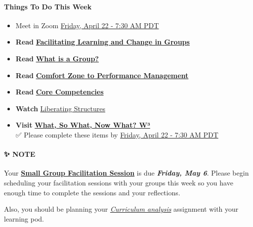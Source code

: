 \documentclass[
]{book}
\providecommand{\tightlist}{%
  \setlength{\itemsep}{0pt}\setlength{\parskip}{0pt}}
\begin{document}
\begin{todo}
\hypertarget{things-to-do-this-week}{%
\paragraph{Things To Do This Week}\label{things-to-do-this-week}}

\begin{itemize}
\tightlist
\item
  Meet in Zoom
  \href{https://www.timeanddate.com/worldclock/fixedtime.html?msg=LDRS+663+Meeting\&iso=20220422T0730\&p1=1109\&ah=1\&am=30}{Friday,
  April 22 - 7:30 AM PDT}\\
\item
  \textbf{Read}
  \href{https://infed.org/mobi/facilitating-learning-and-change-in-groups-and-group-sessions/}{\textbf{Facilitating
  Learning and Change in Groups}}\\
\item
  \textbf{Read}
  \href{https://infed.org/mobi/what-is-a-group/}{\textbf{What is a
  Group?}}\\
\item
  \textbf{Read}
  \href{https://www.researchgate.net/publication/228957278_From_Comfort_Zone_to_Performance_Management}{\textbf{Comfort
  Zone to Performance Management}}\\
\item
  \textbf{Read}
  \href{https://www.iaf-world.org/site/professional/core-competencies}{\textbf{Core
  Competencies}}\\
\item
  \textbf{Watch}
  \href{https://player.vimeo.com/video/364868276}{Liberating
  Structures}\\
\item
  \textbf{Visit}
  \href{http://www.liberatingstructures.com/9-what-so-what-now-what-w/}{\textbf{What,
  So What, Now What? W³}}\\
  ✅ Please complete these items by
  \href{https://www.timeanddate.com/worldclock/fixedtime.html?msg=LDRS+663+Meeting\&iso=20220422T0730\&p1=1109\&ah=1\&am=30}{Friday,
  April 22 - 7:30 AM PDT}
\end{itemize}
\end{todo}

\begin{protip}
\hypertarget{note}{%
\paragraph*{✨ NOTE}\label{note}}

Your \href{https://far.twu.ca/ldrs/663-202109/assignments}{\textbf{Small
Group Facilitation Session}} is due \textbf{\emph{Friday, May 6}}.
Please begin scheduling your facilitation sessions with your groups this
week so you have enough time to complete the sessions and your
reflections.

Also, you should be planning your
\href{https://ma-lead.github.io/ldrs663/assessments.html\#facilitated-curriculum-analysis-10}{\emph{Curriculum
analysis}} assignment with your learning pod.
\end{protip}
\end{document}
